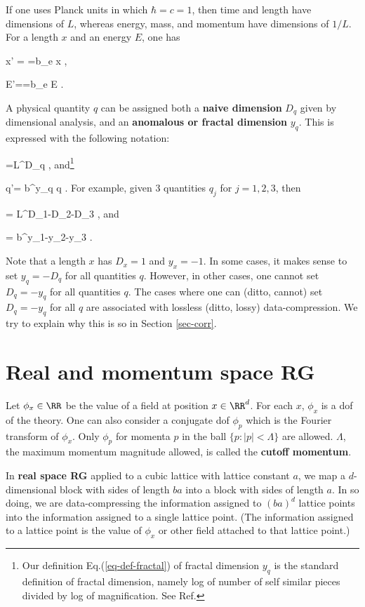 \documentclass[12pt]{article}
\begin{document}
If one uses Planck units in which
$\hbar = c = 1$, then time and length
have dimensions of $L$,
whereas energy, mass, and momentum
have dimensions of $1/L$. For
a length $x$ and
an energy $E$,
one has

\beq
x' = =b_e x
\;,
\eeq

\beq
E'==b_e E
\;.
\eeq

A physical quantity $q$
can be assigned both a \textbf{naive dimension} $D_q$
given by dimensional analysis,
and an \textbf{anomalous or fractal dimension}
 $y_q$.
This is expressed with the following notation:

\beq
[q]=L^{D_q}
\;,
\eeq
and\footnote{Our
definition Eq.(\ref{eq-def-fractal})
of fractal dimension $y_q$ is the standard
definition of fractal dimension, namely
log of number of self similar
pieces divided by log of magnification. See
Ref.\cite{wiki-fractal}}

\beq
q'= b^{y_q} q
\;.
\label{eq-def-fractal}
\eeq
For example,
given 3 quantities $q_j$ for $j=1,2,3$, then

\beq
{}=
L^{D_1-D_2-D_3}
\;,
\eeq
and

\beq
{}
= b^{y_1-y_2-y_3}
\;.
\eeq

Note that a length $x$ has
$D_x=1$ and $y_x=-1$.
In some cases, it makes sense
to set $y_q=-D_q$ for all quantities $q$.
However, in other
cases, one cannot set $D_q=-y_q$
for all quantities $q$. The cases where one
can (ditto, cannot) set $D_q=-y_q$
for all $q$ are associated with lossless (ditto, lossy)
data-compression. We try to explain
why this is so in Section \ref{sec-corr}.

\section{Real and momentum space RG}
Let $\phi_x\in \RR$
be the value of a field
at position $x\in \RR^d$. For
each $x$, $\phi_x$ is a dof of the
theory. One can also consider
a conjugate dof $\phi_p$
which is the Fourier transform of $\phi_x$.
Only $\phi_p$
for  momenta $p$
in
the ball $\{p: |p|<\Lambda\}$
are allowed.
$\Lambda$,
the maximum momentum magnitude allowed,
 is called the {\bf cutoff
momentum}.


In {\bf real space RG}
applied to a cubic lattice with
lattice constant $a$,
we map
a $d$-dimensional block with sides of length $b a$
into a  block with sides of length $a$.
In so doing, we are
data-compressing the information
assigned to $(b a)^d$ lattice points
into the information assigned to a
single lattice point.
(The information assigned
to a lattice point is the value
of $\phi_x$ or other field
attached to that lattice point.)
\end{document}

